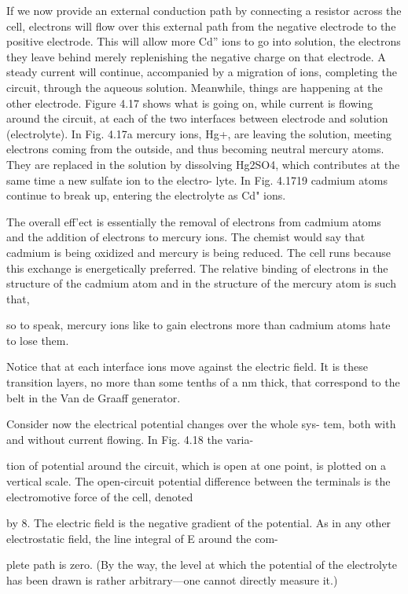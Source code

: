 If we now provide an external conduction path by connecting a
resistor across the cell, electrons will flow over this external path
from the negative electrode to the positive electrode. This will allow
more Cd'' ions to go into solution, the electrons they leave behind
merely replenishing the negative charge on that electrode. A steady
current will continue, accompanied by a migration of ions, completing
the circuit, through the aqueous solution. Meanwhile, things
are happening at the other electrode. Figure 4.17 shows what is
going on, while current is flowing around the circuit, at each of the
two interfaces between electrode and solution (electrolyte). In
Fig. 4.17a mercury ions, Hg+, are leaving the solution, meeting electrons
coming from the outside, and thus becoming neutral mercury
atoms. They are replaced in the solution by dissolving Hg2SO4,
which contributes at the same time a new sulfate ion to the electro-
lyte. In Fig. 4.1719 cadmium atoms continue to break up, entering
the electrolyte as Cd" ions.

The overall eff'ect is essentially the removal of electrons from cadmium
atoms and the addition of electrons to mercury ions. The
chemist would say that cadmium is being oxidized and mercury is
being reduced. The cell runs because this exchange is energetically
preferred. The relative binding of electrons in the structure of the
cadmium atom and in the structure of the mercury atom is such that,

so to speak, mercury ions like to gain electrons more than cadmium
atoms hate to lose them.

Notice that at each interface ions move against the electric field.
It is these transition layers, no more than some tenths of a nm thick, that
correspond to the belt in the Van de Graaff generator.

Consider now the electrical potential changes over the whole sys-
tem, both with and without current flowing. In Fig. 4.18 the varia-

tion of potential around the circuit, which is open at one point, is
plotted on a vertical scale. The open-circuit potential difference
between the terminals is the electromotive force of the cell, denoted

by 8. The electric field is the negative gradient of the potential. As
in any other electrostatic field, the line integral of E around the com-

plete path is zero. (By the way, the level at which the potential of
the electrolyte has been drawn is rather arbitrary---one cannot
directly measure it.)


